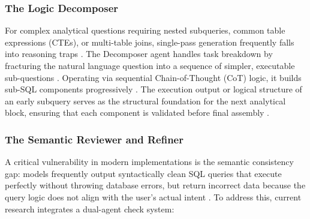 \subsubsection{The Logic Decomposer}
For complex analytical questions requiring nested subqueries, common table expressions (CTEs), or multi-table joins,
single-pass generation frequently falls into reasoning traps \cite{Multi_Agent_Collaborative_Framework_for_Text_to_SQL, TEXT_TO_SQL_WORKFLOWS, Text_to_SQL_in_the_Era_of_LLMs}. The
Decomposer agent handles task breakdown by fracturing the natural language question into a sequence of simpler,
executable sub-questions \cite{Multi_Agent_Collaborative_Framework_for_Text_to_SQL, Text_to_SQL_in_the_Era_of_LLMs}. Operating via sequential Chain-of-Thought (CoT) logic,
it builds sub-SQL components progressively \cite{Multi_Agent_Collaborative_Framework_for_Text_to_SQL, Text_to_SQL_in_the_Era_of_LLMs}. The execution output or logical
structure of an early subquery serves as the structural foundation for the next analytical block, ensuring that each
component is validated before final assembly \cite{Multi_Agent_Collaborative_Framework_for_Text_to_SQL}.

\subsubsection{The Semantic Reviewer and Refiner}
A critical vulnerability in modern implementations is the semantic consistency gap: models frequently output
syntactically clean SQL queries that execute perfectly without throwing database errors, but return incorrect data
because the query logic does not align with the user's actual intent \cite{SQLFixAgent_Towards_Semantic_Accurate_Text_to_SQL, Text_to_SQL_in_the_Era_of_LLMs}. To
address this, current research integrates a dual-agent check system:

